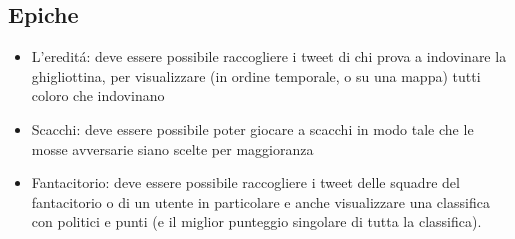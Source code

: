 \documentclass{article}
\begin{document}
\subsection{Epiche}
\begin{itemize}
    \item L'eredit\'a: deve essere possibile raccogliere i tweet di chi prova a indovinare la ghigliottina, per visualizzare (in ordine temporale, o su una mappa) tutti coloro che indovinano
    \item Scacchi: deve essere possibile poter giocare a scacchi in modo tale che le mosse avversarie siano scelte per maggioranza
    \item Fantacitorio: deve essere possibile raccogliere i tweet delle squadre del fantacitorio o di un utente in particolare e anche visualizzare una classifica con politici e punti (e il miglior punteggio singolare di tutta la classifica).
\end{itemize}
\end{document}
